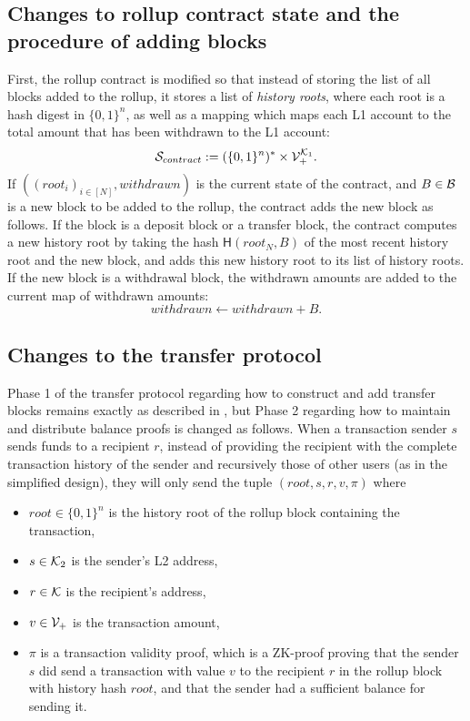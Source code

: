 \subsection{Changes to rollup contract state and the procedure of adding blocks}

First, the rollup contract is modified so that instead of storing the list of all blocks added to the rollup, it stores a list of \emph{history roots}, where each root is a hash digest in \(\{0,1\}^n\), as well as a mapping which maps each L1 account to the total amount that has been withdrawn to the L1 account: \[\mathcal{S}_{contract} := (\{0,1\}^n)^* \times \mathcal{V}_+^{\mathcal{K}_1}.\] If \(((root_i)_{i \in [N]}, withdrawn)\) is the current state of the contract, and \(B \in \mathcal{B}\) is a new block to be added to the rollup, the contract adds the new block as follows. If the block is a deposit block or a transfer block, the contract computes a new history root by taking the hash \(\mathsf{H}(root_N,B)\) of the most recent history root and the new block, and adds this new history root to its list of history roots. If the new block is a withdrawal block, the withdrawn amounts are added to the current map of withdrawn amounts: \[withdrawn \leftarrow withdrawn + B.\]

\subsection{Changes to the transfer protocol}

Phase 1 of the transfer protocol regarding how to construct and add transfer blocks remains exactly as described in , but Phase 2 regarding how to maintain and distribute balance proofs is changed as follows. When a transaction sender \(s\) sends funds to a recipient \(r\), instead of providing the recipient with the complete transaction history of the sender and recursively those of other users (as in the simplified design), they will only send the tuple \((root, s, r, v, \pi)\) where

\begin{itemize}
	\item \(root \in \{0,1\}^n\) is the history root of the rollup block containing the transaction,
	\item \(s \in \mathcal{K}_2\) is the sender's L2 address,
	\item \(r \in \mathcal{K}\) is the recipient's address,
	\item \(v \in \mathcal{V}_+\) is the transaction amount,
	\item \(\pi\) is a transaction validity proof, which is a ZK-proof proving that the sender \(s\) did send a transaction with value \(v\) to the recipient \(r\) in the rollup block with history hash \(root\), and that the sender had a sufficient balance for sending it.
\end{itemize}

